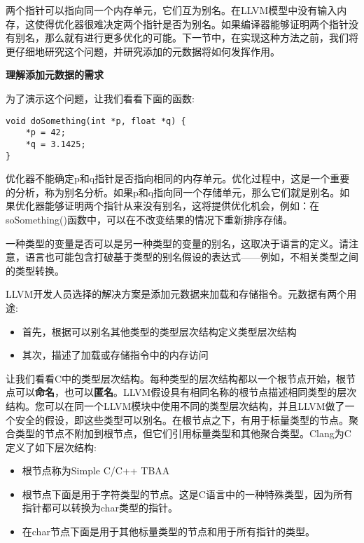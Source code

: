 两个指针可以指向同一个内存单元，它们互为别名。在LLVM模型中没有输入内存，这使得优化器很难决定两个指针是否为别名。如果编译器能够证明两个指针没有别名，那么就有进行更多优化的可能。下一节中，在实现这种方法之前，我们将更仔细地研究这个问题，并研究添加的元数据将如何发挥作用。\par

\hspace*{\fill} \par %
\textbf{理解添加元数据的需求}

为了演示这个问题，让我们看看下面的函数:\par

\begin{lstlisting}[caption={}]
void doSomething(int *p, float *q) {
	*p = 42;
	*q = 3.1425;
}
\end{lstlisting}

优化器不能确定p和q指针是否指向相同的内存单元。优化过程中，这是一个重要的分析，称为别名分析。如果p和q指向同一个存储单元，那么它们就是别名。如果优化器能够证明两个指针从来没有别名，这将提供优化机会，例如：在soSomething()函数中，可以在不改变结果的情况下重新排序存储。\par

一种类型的变量是否可以是另一种类型的变量的别名，这取决于语言的定义。请注意，语言也可能包含打破基于类型的别名假设的表达式——例如，不相关类型之间的类型转换。\par

LLVM开发人员选择的解决方案是添加元数据来加载和存储指令。元数据有两个用途:\par

\begin{itemize}
\item 首先，根据可以别名其他类型的类型层次结构定义类型层次结构
\item 其次，描述了加载或存储指令中的内存访问
\end{itemize}

让我们看看C中的类型层次结构。每种类型的层次结构都以一个根节点开始，根节点可以\textbf{命名}，也可以\textbf{匿名}。LLVM假设具有相同名称的根节点描述相同类型的层次结构。您可以在同一个LLVM模块中使用不同的类型层次结构，并且LLVM做了一个安全的假设，即这些类型可以别名。在根节点之下，有用于标量类型的节点。聚合类型的节点不附加到根节点，但它们引用标量类型和其他聚合类型。Clang为C定义了如下层次结构:\par

\begin{itemize}
\item 根节点称为Simple C/C++ TBAA
\item 根节点下面是用于字符类型的节点。这是C语言中的一种特殊类型，因为所有指针都可以转换为char类型的指针。
\item 在char节点下面是用于其他标量类型的节点和用于所有指针的类型。
\end{itemize}

